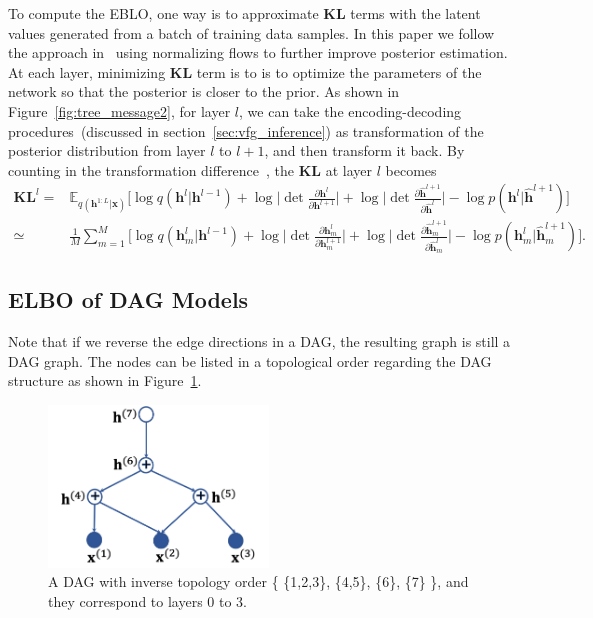 \documentclass{article}
\begin{document}
To compute the EBLO, one way is to approximate  $\mathbf{KL}$ terms with the latent values generated from a batch of training data samples. In this paper we follow the approach in~\cite{rezende2015variational,kingma2016improving,berg2018sylvester}  using normalizing flows to further improve posterior estimation. At each layer,  minimizing  $\mathbf{KL}$ term is to is to optimize the parameters of the network so that the posterior is closer to the prior. As shown in Figure~\ref{fig:tree_message2}, for layer $l$,  we can take the  encoding-decoding procedures~(discussed in section~\ref{sec:vfg_inference}) as transformation of the posterior distribution from layer $l$ to $l+1$, and then transform it back. By  counting in the transformation difference~\cite{rezende2015variational,kingma2016improving,berg2018sylvester}, the $\mathbf{KL}$ at layer $l$ becomes 
\begin{align*}
\mathbf{KL}^l=&\mathbb{E}_{q(\mathbf{h}^{1:L}|\mathbf{x})}\bigg[  \log q(\mathbf{h}^{l}|\mathbf{h}^{l-1}) +\log \bigg|\det \frac{\partial \mathbf{h}^{l}}{\partial \mathbf{h}^{l+1}}\bigg| + \log \bigg|\det \frac{\partial \widehat{\mathbf{h}}^{l+1}}{\partial \widehat{\mathbf{h}}^{l}}\bigg|   - \log p(\mathbf{h}^{l}|\widehat{\mathbf{h}}^{l+1}) \bigg]\\
\simeq & \frac{1}{M}\sum_{m=1}^M\bigg[ \log q(\mathbf{h}^{l}_m|\mathbf{h}^{l-1}) +\log \bigg|\det \frac{\partial \mathbf{h}^{l}_m}{\partial \mathbf{h}^{l+1}_m}\bigg| + \log \bigg|\det \frac{\partial \widehat{\mathbf{h}}^{l+1}_m}{\partial \widehat{\mathbf{h}}^{l}_m}\bigg|   - \log p(\mathbf{h}^{l}_m|\widehat{\mathbf{h}}_m^{l+1}) \bigg].
\end{align*}





\subsection{ELBO of DAG Models}\label{appd:dag_elbo}
Note that if we reverse the edge directions in a DAG, the resulting graph is still a DAG graph.  
The nodes can be listed in a topological order regarding the DAG structure as shown in Figure~\ref{fig:dag}. 

\begin{figure}[H]
    \centering
    \includegraphics[width=2.3in]{fig/dag.png}
    \caption{A DAG  with inverse topology order \big\{ \{1,2,3\}, \{4,5\}, \{6\},  \{7\} \big\}, and they  correspond to layers 0 to 3.  }
    \label{fig:dag}
\end{figure}
\end{document}
